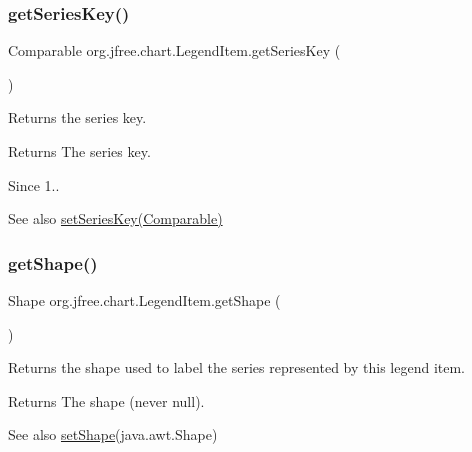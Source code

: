 \subsubsection{\texorpdfstring{get\+Series\+Key()}{getSeriesKey()}}
{\footnotesize\ttfamily Comparable org.\+jfree.\+chart.\+Legend\+Item.\+get\+Series\+Key (\begin{DoxyParamCaption}{ }\end{DoxyParamCaption})}

Returns the series key.

\begin{DoxyReturn}{Returns}
The series key.
\end{DoxyReturn}
\begin{DoxySince}{Since}
1..
\end{DoxySince}
\begin{DoxySeeAlso}{See also}
\mbox{\hyperlink{classorg_1_1jfree_1_1chart_1_1_legend_item_abaaa01a07ecba893e71c52a54179c087}{set\+Series\+Key(\+Comparable)}} 
\end{DoxySeeAlso}
\mbox{\label{classorg_1_1jfree_1_1chart_1_1_legend_item_a08b6718ae34a4c7be04cdf48494cc1d3}} 
\subsubsection{\texorpdfstring{get\+Shape()}{getShape()}}
{\footnotesize\ttfamily Shape org.\+jfree.\+chart.\+Legend\+Item.\+get\+Shape (\begin{DoxyParamCaption}{ }\end{DoxyParamCaption})}

Returns the shape used to label the series represented by this legend item.

\begin{DoxyReturn}{Returns}
The shape (never {\ttfamily null}).
\end{DoxyReturn}
\begin{DoxySeeAlso}{See also}
\mbox{\hyperlink{classorg_1_1jfree_1_1chart_1_1_legend_item_a14e41e94aa2b13b01b1cf3c6ff12dc55}{set\+Shape}}(java.\+awt.\+Shape) 
\end{DoxySeeAlso}
\mbox{\label{classorg_1_1jfree_1_1chart_1_1_legend_item_ab6b24eec75be7370f4fc8fe241932ff3}} 
